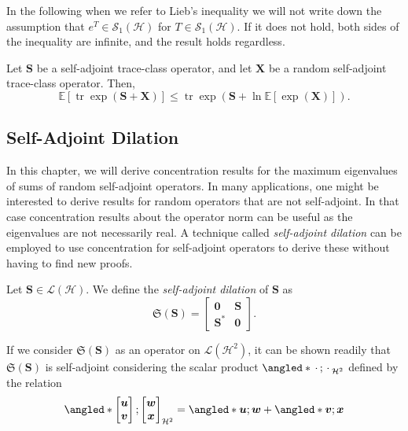 In the following when we refer to Lieb's inequality we will not write down the assumption that \( e^{T} \in \mathcal{S}_1(\mathcal{H}) \) for \( T \in \mathcal{S}_1(\mathcal{H}) \). If it does not hold, both sides of the inequality are infinite, and the result holds regardless.

\begin{corl}
    Let \( \bm{S} \) be a self-adjoint trace-class operator, and let \( \bm{X} \) be a random self-adjoint trace-class operator. Then,
    \[ \mathbb{E}[\operatorname{tr} \operatorname{exp} (\bm{S}+\bm{X})]  \leq \operatorname{tr} \operatorname{exp}(\bm{S} + \operatorname{ln} \mathbb{E}[\operatorname{exp}(\bm{X})]).\]
\end{corl}


\subsection{Self-Adjoint Dilation}
In this chapter, we will derive concentration results for the maximum eigenvalues of sums of random self-adjoint operators. In many applications, one might be interested to derive results for random operators that are not self-adjoint. In that case concentration results about the operator norm can be useful as the eigenvalues are not necessarily real. A technique called \emph{self-adjoint dilation} can be employed to use concentration for self-adjoint operators to derive these without having to find new proofs. 

\begin{defn}
    Let \( \bm{S}\in \mathcal{L}(\mathcal{H}) \). We define the \emph{self-adjoint dilation} of \( \bm{S} \) as 
    \[ \mathfrak{S}(\bm{S} ) = 
      \begin{bmatrix}
        \bm{0} & \bm{S} \\
        \bm{S}^{*} & \bm{0}
    \end{bmatrix}
    .\]
\end{defn}


If we consider \( \mathfrak{S}(\bm{S} )\) as an operator on \( \mathcal{L}(\mathcal{H}^{2}) \), it can be shown readily that \( \mathfrak{S}\left(\bm{S}\right) \) is self-adjoint considering the scalar product \( \angled*{\, \cdot \,; \, \cdot \,}_{\mathcal{H}^{2}} \) defined by the relation 
\[ \angled*{ \begin{bmatrix} \bm{u} \\ \bm{v} \end{bmatrix}; \begin{bmatrix} \bm{w} \\ \bm{x}\end{bmatrix}}_{\mathcal{H}^{2}} = \angled*{ \bm{u}; \bm{w}} + \angled*{\bm{v};\bm{x}} \]



